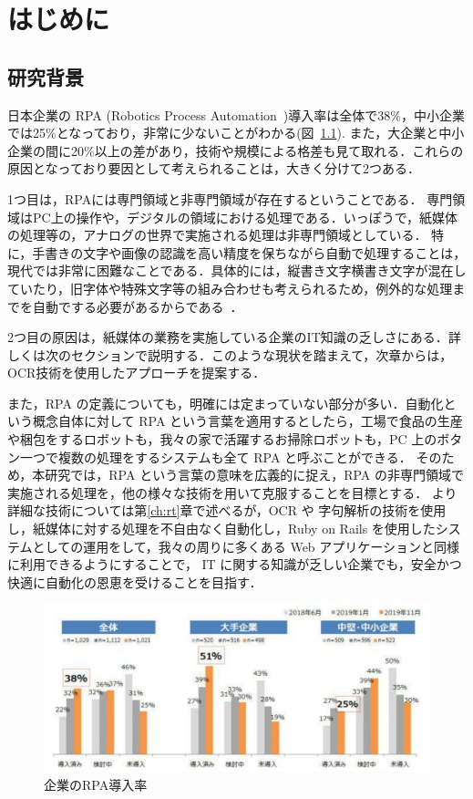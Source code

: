 \chapter{はじめに}
\label{ch:intro}

\quad

\section{研究背景}
\label{sec:research_bg}

日本企業の RPA (Robotics Process Automation~\cite{yasuhiro2017rpa})導入率は全体で38\%，中小企業では25\%となっており，非常に少ないことがわかる(図~\ref{fig:rpa_rate}).
また，大企業と中小企業の間に20\%以上の差があり，技術や規模による格差も見て取れる．これらの原因となっており要因として考えられることは，大きく分けて2つある．

1つ目は，RPAには専門領域と非専門領域が存在するということである．
専門領域はPC上の操作や，デジタルの領域における処理である．いっぽうで，紙媒体の処理等の，アナログの世界で実施される処理は非専門領域としている．
特に，手書きの文字や画像の認識を高い精度を保ちながら自動で処理することは，現代では非常に困難なことである．具体的には，縦書き文字横書き文字が混在していたり，旧字体や特殊文字等の組み合わせも考えられるため，例外的な処理までを自動でする必要があるからである~\cite{d-analyzer2019rpa}．

2つ目の原因は，紙媒体の業務を実施している企業のIT知識の乏しさにある．詳しくは次のセクションで説明する．このような現状を踏まえて，次章からは，OCR技術を使用したアプローチを提案する．

また，RPA の定義についても，明確には定まっていない部分が多い．自動化という概念自体に対して RPA という言葉を適用するとしたら，工場で食品の生産や梱包をするロボットも，我々の家で活躍するお掃除ロボットも，PC 上のボタン一つで複数の処理をするシステムも全て RPA と呼ぶことができる．
そのため，本研究では，RPA という言葉の意味を広義的に捉え，RPA の非専門領域で実施される処理を，他の様々な技術を用いて克服することを目標とする．
より詳細な技術については第\ref{ch:rt}章で述べるが，OCR や 字句解析の技術を使用し，紙媒体に対する処理を不自由なく自動化し，Ruby on Rails を使用したシステムとしての運用をして，我々の周りに多くある Web アプリケーションと同様に利用できるようにすることで，
IT に関する知識が乏しい企業でも，安全かつ快適に自動化の恩恵を受けることを目指す．

\clearpage
\begin{figure}[htbp]
\centering
\includegraphics[scale = 0.6]{img/rpa_rate.pdf}
\caption{企業のRPA導入率}
\label{fig:rpa_rate}
\end{figure}%

